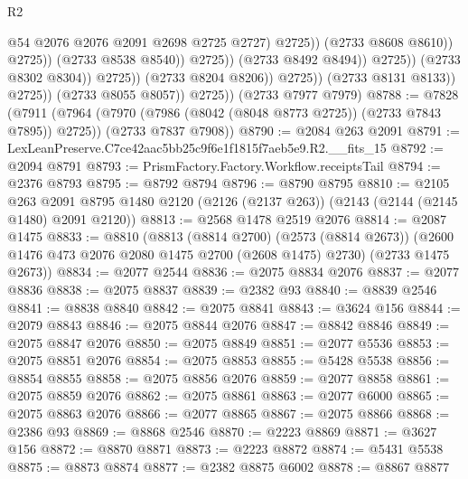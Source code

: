 \begin{lexlean}{R2}
\begin{coremodule}
                                                    @54
                                                    @2076
                                                    @2076
                                                    @2091
                                                    @2698
                                                    @2725
                                                    @2727)
                                                  @2725))
                                              (@2733 @8608 @8610))
                                            @2725))
                                        (@2733 @8538 @8540))
                                      @2725))
                                  (@2733 @8492 @8494))
                                @2725))
                            (@2733 @8302 @8304))
                          @2725))
                      (@2733 @8204 @8206))
                    @2725))
                (@2733 @8131 @8133))
              @2725))
          (@2733 @8055 @8057))
        @2725))
    (@2733 @7977 @7979)
@8788 := @7828
    (@7911
      (@7964 (@7970 (@7986 (@8042 (@8048 @8773 @2725)) (@2733 @7843 @7895)) @2725))
      (@2733 @7837 @7908))
@8790 := @2084 @263 @2091
@8791 := LexLeanPreserve.C7ce42aac5bb25c9f6e1f1815f7aeb5e9.R2.__fits_15
@8792 := @2094 @8791
@8793 := PrismFactory.Factory.Workflow.receiptsTail
@8794 := @2376 @8793
@8795 := @8792 @8794
@8796 := @8790 @8795
@8810 := @2105
    @263
    @2091
    @8795
    @1480
    @2120
    (@2126 (@2137 @263))
    (@2143 (@2144 (@2145 @1480) @2091 @2120))
@8813 := @2568 @1478 @2519 @2076
@8814 := @2087 @1475
@8833 := @8810
    (@8813
      (@8814 @2700)
      (@2573 (@8814 @2673))
      (@2600 @1476 @473 @2076 @2080 @1475 @2700 (@2608 @1475) @2730)
      (@2733 @1475 @2673))
@8834 := @2077 @2544
@8836 := @2075 @8834 @2076
@8837 := @2077 @8836
@8838 := @2075 @8837
@8839 := @2382 @93
@8840 := @8839 @2546
@8841 := @8838 @8840
@8842 := @2075 @8841
@8843 := @3624 @156
@8844 := @2079 @8843
@8846 := @2075 @8844 @2076
@8847 := @8842 @8846
@8849 := @2075 @8847 @2076
@8850 := @2075 @8849
@8851 := @2077 @5536
@8853 := @2075 @8851 @2076
@8854 := @2075 @8853
@8855 := @5428 @5538
@8856 := @8854 @8855
@8858 := @2075 @8856 @2076
@8859 := @2077 @8858
@8861 := @2075 @8859 @2076
@8862 := @2075 @8861
@8863 := @2077 @6000
@8865 := @2075 @8863 @2076
@8866 := @2077 @8865
@8867 := @2075 @8866
@8868 := @2386 @93
@8869 := @8868 @2546
@8870 := @2223 @8869
@8871 := @3627 @156
@8872 := @8870 @8871
@8873 := @2223 @8872
@8874 := @5431 @5538
@8875 := @8873 @8874
@8877 := @2382 @8875 @6002
@8878 := @8867 @8877

\end{coremodule}
\end{lexlean}
